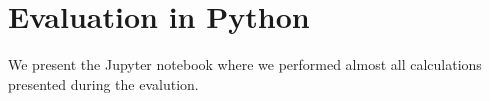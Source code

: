 \chapter{Evaluation in Python}
We present the Jupyter notebook where we performed almost all calculations presented during the evalution.
\begin{verbatim}

\end{verbatim}